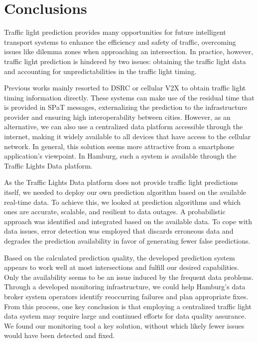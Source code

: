 \section{Conclusions}

Traffic light prediction provides many opportunities for future intelligent transport systems to enhance the efficiency and safety of traffic, overcoming issues like dilemma zones when approaching an intersection. In practice, however, traffic light prediction is hindered by two issues: obtaining the traffic light data and accounting for unpredictabilities in the traffic light timing. 

Previous works mainly resorted to DSRC or cellular V2X to obtain traffic light timing information directly. These systems can make use of the residual time that is provided in SPaT messages, externalizing the prediction to the infrastructure provider and ensuring high interoperability between cities. However, as an alternative, we can also use a centralized data platform accessible through the internet, making it widely available to all devices that have access to the cellular network. In general, this solution seems more attractive from a smartphone application's viewpoint. In Hamburg, such a system is available through the Traffic Lights Data platform.

As the Traffic Lights Data platform does not provide traffic light predictions itself, we needed to deploy our own prediction algorithm based on the available real-time data. To achieve this, we looked at prediction algorithms and which ones are accurate, scalable, and resilient to data outages. A probabilistic approach was identified and integrated based on the available data. To cope with data issues, error detection was employed that discards erroneous data and degrades the prediction availability in favor of generating fewer false predictions. 

Based on the calculated prediction quality, the developed prediction system appears to work well at most intersections and fulfill our desired capabilities. Only the availability seems to be an issue induced by the frequent data problems. Through a developed monitoring infrastructure, we could help Hamburg's data broker system operators identify reoccurring failures and plan appropriate fixes. From this process, one key conclusion is that employing a centralized traffic light data system may require large and continued efforts for data quality assurance. We found our monitoring tool a key solution, without which likely fewer issues would have been detected and fixed.

